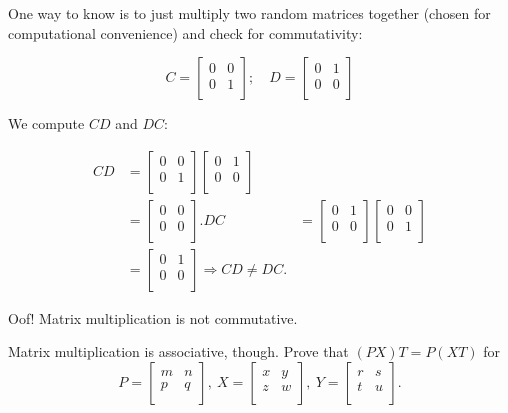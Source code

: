 \documentclass[../key.tex]{subfiles}
\begin{document}
One way to know is to just multiply two random matrices together (chosen for computational convenience) and check for commutativity:

$$C = \begin{bmatrix}
0 & 0 \\
0 & 1 \\
\end{bmatrix};\quad D = \begin{bmatrix}
0 & 1 \\
0 & 0 \\
\end{bmatrix}$$

We compute $CD$ and $DC$:

\begin{align*}
CD &= \begin{bmatrix}
0 & 0 \\
0 & 1 \\
\end{bmatrix}\begin{bmatrix}
0 & 1 \\
0 & 0 \\
\end{bmatrix} \\
&= \begin{bmatrix}
0 & 0 \\
0 & 0 \\
\end{bmatrix}.
DC &= \begin{bmatrix}
0 & 1 \\
0 & 0 \\
\end{bmatrix}\begin{bmatrix}
0 & 0 \\
0 & 1 \\
\end{bmatrix} \\
&= \begin{bmatrix}
0 & 1 \\
0 & 0 \\
\end{bmatrix}
\Longrightarrow CD \neq DC.
\end{align*}

Oof! Matrix multiplication is not commutative.

\begin{outer_problem}
\item Matrix multiplication is associative, though. Prove that $(PX)T=P(XT)$ for $$P=\left[\begin{array}{cc} m & n \\ p & q \\ \end{array}\right],\: X=\left[\begin{array}{cc} x & y \\ z & w \\ \end{array}\right],\: Y=\left[\begin{array}{cc} r & s \\ t & u \\ \end{array}\right].$$
\end{outer_problem}
\end{document}
